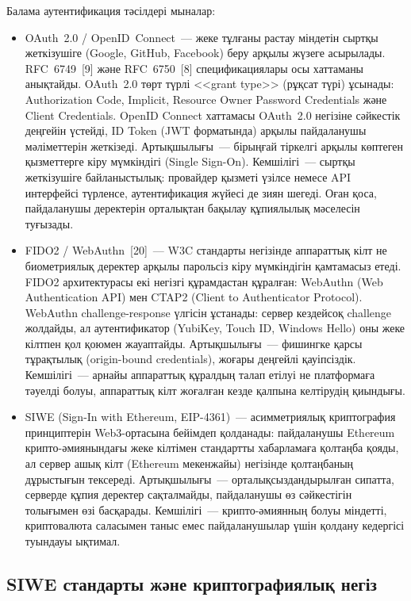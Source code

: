 \documentclass[14pt,a4paper]{extarticle}
\begin{document}
Балама аутентификация тәсілдері мыналар:
\begin{itemize}[nosep]
\item OAuth~2.0 / OpenID~Connect~--- жеке тұлғаны растау міндетін сыртқы жеткізушіге (Google, GitHub, Facebook) беру арқылы жүзеге асырылады. RFC~6749~[9] және RFC~6750~[8] спецификациялары осы хаттаманы анықтайды. OAuth~2.0 төрт түрлі <<grant type>> (рұқсат түрі) ұсынады: Authorization Code, Implicit, Resource Owner Password Credentials және Client Credentials. OpenID Connect хаттамасы OAuth~2.0 негізіне сәйкестік деңгейін үстейді, ID Token (JWT форматында) арқылы пайдаланушы мәліметтерін жеткізеді. Артықшылығы~--- бірыңғай тіркелгі арқылы көптеген қызметтерге кіру мүмкіндігі (Single Sign-On). Кемшілігі~--- сыртқы жеткізушіге байланыстылық: провайдер қызметі үзілсе немесе API интерфейсі түрленсе, аутентификация жүйесі де зиян шегеді. Оған қоса, пайдаланушы деректерін орталықтан бақылау құпиялылық мәселесін туғызады.
\item FIDO2 / WebAuthn~[20]~--- W3C стандарты негізінде аппараттық кілт не биометриялық деректер арқылы парольсіз кіру мүмкіндігін қамтамасыз етеді. FIDO2 архитектурасы екі негізгі құрамдастан құралған: WebAuthn (Web Authentication API) мен CTAP2 (Client to Authenticator Protocol). WebAuthn challenge-response үлгісін ұстанады: сервер кездейсоқ challenge жолдайды, ал аутентификатор (YubiKey, Touch ID, Windows Hello) оны жеке кілтпен қол қоюмен жауаптайды. Артықшылығы~--- фишингке қарсы тұрақтылық (origin-bound credentials), жоғары деңгейлі қауіпсіздік. Кемшілігі~--- арнайы аппараттық құралдың талап етілуі не платформаға тәуелді болуы, аппараттық кілт жоғалған кезде қалпына келтірудің қиындығы.
\item SIWE (Sign-In with Ethereum, EIP-4361)~--- асимметриялық криптография принциптерін Web3-ортасына бейімдеп қолданады: пайдаланушы Ethereum крипто-әмиянындағы жеке кілтімен стандартты хабарламаға қолтаңба қояды, ал сервер ашық кілт (Ethereum мекенжайы) негізінде қолтаңбаның дұрыстығын тексереді. Артықшылығы~--- орталықсыздандырылған сипатта, серверде құпия деректер сақталмайды, пайдаланушы өз сәйкестігін толығымен өзі басқарады. Кемшілігі~--- крипто-әмиянның болуы міндетті, криптовалюта саласымен таныс емес пайдаланушылар үшін қолдану кедергісі туындауы ықтимал.
\end{itemize}

\subsection{SIWE стандарты және криптографиялық негіз}
\end{document}
